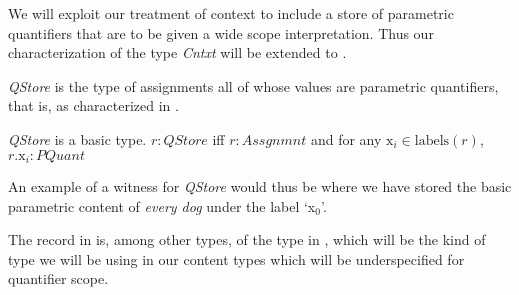 We will exploit our treatment of context to include a store of
parametric quantifiers that are to be given a wide scope
interpretation.  Thus our characterization of the type \textit{Cntxt}
will be extended to \nexteg{}.
\begin{ex} 
\end{ex} 
\textit{QStore} is the type of assignments all of whose values are
parametric quantifiers, that is, as characterized in \nexteg{}.
\begin{ex} 
\textit{QStore} is a basic type.  $r:\textit{QStore}$ iff $r:Assgnmnt$
and for any $\text{x}_i\in\mathrm{labels}(r)$, $r.\text{x}_i:\textit{PQuant}$ 
\end{ex} 
An example of a witness for \textit{QStore} would thus be \nexteg{}
where we have stored the basic parametric content of \textit{every
  dog} under the label `x$_0$'.
\begin{ex} 
        
\end{ex} 
The record in \preveg{} is, among other types, of the type in
\nexteg{}, which will be the kind of type we will be using in our
content types which will be underspecified for quantifier scope.
\begin{ex} 
        
\end{ex}
